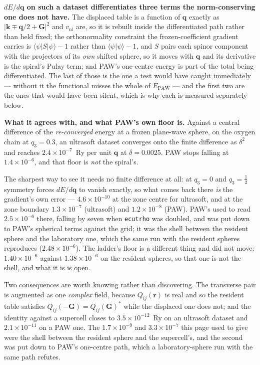 \documentclass[11pt,a4paper]{article}
\newcommand{\code}[1]{\texttt{\small #1}}
\begin{document}
\textbf{$dE/d\mathbf q$ on such a dataset differentiates three terms the
norm-conserving one does not have.} The displaced table is a function of
$\mathbf q$ exactly as $|\mathbf k \mp \mathbf q/2 + \mathbf G|^2$ and
$v_{\mathrm{nl}}$ are, so it is rebuilt inside the differentiated path rather
than held fixed; the orthonormality constraint the frozen-coefficient gradient
carries is $\langle\psi|S|\psi\rangle - 1$ rather than
$\langle\psi|\psi\rangle - 1$, and $S$ pairs each spinor component with the
projectors of its \emph{own} shifted sphere, so it moves with $\mathbf q$ and
its derivative is the spiral's Pulay term; and PAW's one-centre energy is part
of the total being differentiated. The last of those is the one a test would
have caught immediately --- without it the functional misses the whole of
$E_{\mathrm{PAW}}$ --- and the first two are the ones that would have been
silent, which is why each is measured separately below.

\textbf{What it agrees with, and what PAW's own floor is.} Against a central
difference of the \emph{re-converged} energy at a frozen plane-wave sphere, on
the oxygen chain at $q_3 = 0.3$, an ultrasoft dataset converges onto the finite
difference as $\delta^2$ and reaches $2.4\times10^{-7}$~Ry per unit $\mathbf q$
at $\delta = 0.0025$. PAW stops falling at $1.4\times10^{-6}$, and that floor is
\emph{not} the spiral's.

The sharpest way to see it needs no finite difference at all: at $q_3 = 0$ and
$q_3 = \tfrac12$ symmetry forces $dE/d\mathbf q$ to vanish exactly, so what
comes back there \emph{is} the gradient's own error --- $4.6\times10^{-10}$ at
the zone centre for ultrasoft, and at the zone boundary $1.3\times10^{-7}$
(ultrasoft) and $1.2\times10^{-8}$ (PAW). PAW's used to read
$2.5\times10^{-6}$ there, falling by seven when \code{ecutrho} was doubled,
and was put down to PAW's spherical terms against the grid; it was the shell
between the resident sphere and the laboratory one, which the same run with the
resident spheres reproduces ($2.48\times10^{-6}$). The ladder's floor is a
different thing and did not move: $1.40\times10^{-6}$ against
$1.38\times10^{-6}$ on the resident spheres, so that one is not the shell, and
what it is is open.

Two consequences are worth knowing rather than discovering. The transverse pair
is augmented as one \emph{complex} field, because $Q_{ij}(\mathbf r)$ is real
and so the resident table satisfies
$Q_{ij}(-\mathbf G) = Q_{ij}(\mathbf G)^{*}$ while the displaced one does not;
and the identity against a supercell closes to $3.5\times10^{-12}$~Ry on an
ultrasoft dataset and $2.1\times10^{-11}$ on a PAW one. The
$1.7\times10^{-9}$ and $3.3\times10^{-7}$ this page used to give were the shell
between the resident sphere and the supercell's, and the second was put down to
PAW's one-centre path, which a laboratory-sphere run with the same path
refutes.
\end{document}
